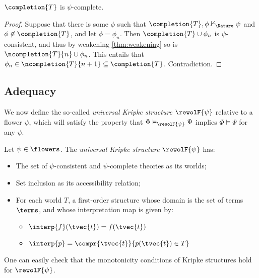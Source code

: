 \begin{lemma}\label{thm:completion-complete}
  $\completion{T}$ is $\psi$-complete.
\end{lemma}
\begin{proof}
  Suppose that there is some $\phi$ such that $\completion{T}, \phi \nvdash_\Nature
  \psi$ and $\phi \not\in \completion{T}$, and let $\phi = \phi_n$. Then
  $\completion{T} \cup \phi_n$ is $\psi$-consistent, and thus by weakening
  \ref{thm:weakening} so is $\ncompletion{T}{n} \cup \phi_n$. This entails that
  $\phi_n \in \ncompletion{T}{n+1} \subseteq \completion{T}$. Contradiction.
\end{proof}

\subsection{Adequacy}

We now define the so-called \emph{universal Kripke structure} $\rewolF{\psi}$
relative to a flower $\psi$, which will satisfy the property that $\Phi
\vDash_{\rewolF{\psi}} \Psi$ implies $\Phi \vDash \Psi$ for any $\psi$.

\begin{definition}\label{def:kcanon}
  Let $\psi \in \flowers$. The \emph{universal Kripke structure}
  $\rewolF{\psi}$ has:
  \begin{itemize}
    \item The set of $\psi$-consistent and $\psi$-complete theories as its worlds;
    \item Set inclusion as its accessibility relation;
    \item For each world $T$, a first-order structure whose domain is the set of
    terms $\terms$, and whose interpretation map is given by:
      \begin{itemize}
        \item $\interp{f}(\tvec{t}) = f(\tvec{t})$
        \item $\interp{p} = \compr{\tvec{t}}{p(\tvec{t}) \in T}$
      \end{itemize}
  \end{itemize}
  One can easily check that the monotonicity conditions of Kripke structures
  hold for $\rewolF{\psi}$.
\end{definition}

